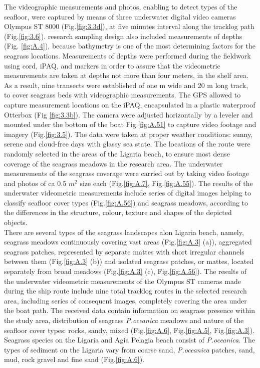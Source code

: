 \documentclass[11pt]{article}
\begin{document}
The videographic measurements and photos, enabling to detect types of the
seafloor, were captured by means of three underwater digital video cameras \ac{Olympus ST} 8000  (Fig.\ref{fig:3.3d})\label{page-26}, at
five minutes interval along the tracklog path (Fig.\ref{fig:3.6}).
research sampling design also included measurements of depths (Fig. \ref{fig:A.4}), because bathymetry is one of the
most determining factors for the seagrass locations. Measurements of depths were performed during
the fieldwork using cord, \ac{iPAQ}, and markers in order to assure that the videometric measurements
are taken at depths not more than four meters, in the shelf area.
As a result, nine transects were established of one m wide and 20 m long track, to cover seagrass beds
with videographic measurements. The \ac{GPS} allowed to capture measurement locations on the \ac{iPAQ},
encapsulated in a plastic waterproof Otterbox (Fig \ref{fig:3.3b}). The camera were adjusted horizontally by a leveler and
mounted under the bottom of the boat Fig.\ref{fig:A.51}\label{page-27} to capture video footage and imagery (Fig.\ref{fig:3.5}). The data
were taken at proper weather conditions: sunny, serene and cloud-free days with glassy sea state. 
The locations of the route were randomly selected in the areas of the Ligaria beach, to ensure most dense
coverage of the seagrass meadows in the research area. The underwater measurements of the seagrass
coverage were carried out by taking video footage and photos of ca 0.5 $m^2$ size each (Fig.\ref{fig:A.7}, Fig.\ref{fig:A.55}).
The results of the underwater videometric measurements include series of digital images helping to
classify seafloor cover types (Fig.\ref{fig:A.56}) and seagrass meadows, according to the differences in the structure,
colour, texture and shapes of the depicted objects\label{page-27}.\\
There are several types of the seagrass landscapes alon Ligaria beach, namely, seagrass meadows
continuously covering vast areas (Fig.\ref{fig:A.3} (a)), aggregated seagrass patches, represented by separate mattes with short irregular channels between them (Fig.\ref{fig:A.3} (b)) and isolated seagrass patches, or mattes, located separately from broad meadows (Fig.\ref{fig:A.3} (c), Fig.\ref{fig:A.56}).
The results of the underwater videometric measurements of the \ac{Olympus ST} cameras made during the
ship route include nine total tracklog routes in the selected research area, including series of
consequent images, completely covering the area under the boat path. The received data contain
information on seagrass presence within the study area, distribution of seagrass \textit{P.oceanica} meadows
and nature of the seafloor cover types: rocks, sandy, mixed (Fig.\ref{fig:A.6}, Fig.\ref{fig:A.5}, Fig.\ref{fig:A.3}). Seagrass species on the Ligaria and Agia Pelagia beach consist of \textit{P.oceanica}. The types of sediment on the Ligaria vary from coarse sand,
\textit{P.oceanica} patches, sand, mud, rock gravel and fine sand (Fig.\ref{fig:A.6}).
\end{document}
